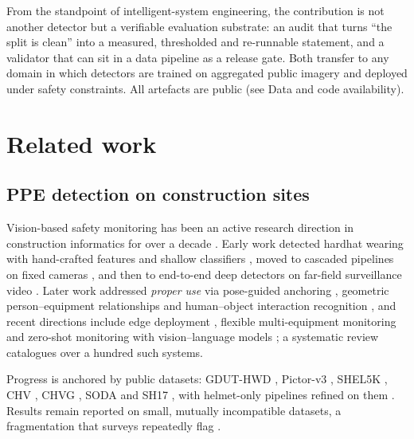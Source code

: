 \documentclass[review,12pt]{elsarticle}
\begin{document}
From the standpoint of intelligent-system engineering, the contribution
is not another detector but a verifiable evaluation substrate: an audit
that turns ``the split is clean'' into a measured, thresholded and
re-runnable statement, and a validator that can sit in a data pipeline
as a release gate. Both transfer to any domain in which detectors are
trained on aggregated public imagery and deployed under safety
constraints. All artefacts are public (see Data and code availability).

\section{Related work}
\label{sec:related}

\subsection{PPE detection on construction sites}
Vision-based safety monitoring has been an active research direction
in construction informatics for over a decade
\citep{seo2015vision,fang2020review}. Early work detected hardhat
wearing with hand-crafted features and shallow classifiers
\citep{park2015hardhat}, moved to cascaded pipelines on fixed cameras
\citep{mneymneh2019vision}, and then to end-to-end deep detectors on
far-field surveillance video \citep{fang2018hardhat}. Later work
addressed \emph{proper use} via pose-guided anchoring
\citep{xiong2021pose}, geometric person--equipment relationships
\citep{chen2020vision} and human--object interaction recognition
\citep{tang2020hoi}, and recent directions include edge deployment
\citep{kim2025edge}, flexible multi-equipment monitoring
\citep{pisu2024ppe} and zero-shot monitoring with vision--language
models \citep{gil2024zeroshot}; a systematic review
\citep{vukicevic2024review} catalogues over a hundred such systems.

Progress is anchored by public datasets: GDUT-HWD \citep{wu2019gdut},
Pictor-v3 \citep{nath2020ppe}, SHEL5K \citep{otgonbold2022shel5k},
CHV \citep{wang2021chv}, CHVG \citep{ferdous2022ppe}, SODA
\citep{duan2022soda} and SH17 \citep{ahmad2024sh17}, with helmet-only
pipelines refined on them \citep{hayat2022helmet}. Results remain
reported on small, mutually incompatible datasets, a fragmentation
that surveys repeatedly flag \citep{fang2020review,vukicevic2024review}.
\end{document}
